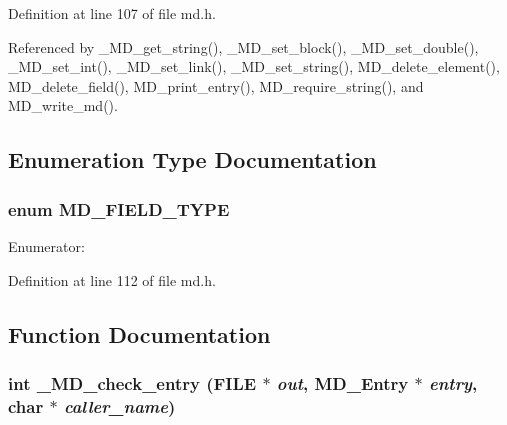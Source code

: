 Definition at line 107 of file md.h.

Referenced by \_\-MD\_\-get\_\-string(), \_\-MD\_\-set\_\-block(), \_\-MD\_\-set\_\-double(), \_\-MD\_\-set\_\-int(), \_\-MD\_\-set\_\-link(), \_\-MD\_\-set\_\-string(), MD\_\-delete\_\-element(), MD\_\-delete\_\-field(), MD\_\-print\_\-entry(), MD\_\-require\_\-string(), and MD\_\-write\_\-md().

\subsection{Enumeration Type Documentation}
\subsubsection{\setlength{\rightskip}{0pt plus 5cm}enum \bf{MD\_\-FIELD\_\-TYPE}}\label{md_8h_f759e9ac9fe5b3112dd641e85448a170}


\begin{Desc}
\item[Enumerator: ]\par
\begin{description}
\item[{\em 
MD\_\-REQUIRED\_\-FIELD\label{md_8h_f759e9ac9fe5b3112dd641e85448a170072d545f4ce74ce4e3b35bde0a1deeb7}
}]\item[{\em 
MD\_\-OPTIONAL\_\-FIELD\label{md_8h_f759e9ac9fe5b3112dd641e85448a1703a4bc4ce323d1338a2504d2e9874564d}
}]\end{description}
\end{Desc}



Definition at line 112 of file md.h.

\subsection{Function Documentation}
\subsubsection{\setlength{\rightskip}{0pt plus 5cm}int \_\-MD\_\-check\_\-entry (FILE $\ast$ {\em out}, \bf{MD\_\-Entry} $\ast$ {\em entry}, char $\ast$ {\em caller\_\-name})}\label{md_8h_5f7bc3cc69f39e3690dbdae2cd1d6507}




